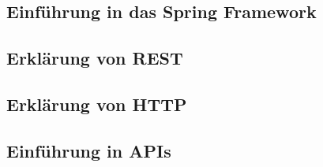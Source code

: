 \subsection{Einführung in das Spring Framework}
  \label{Einführung in das Spring Framework}
  
\pagebreak

\subsection{Erklärung von REST}
  \label{Erklärung von REST}
  
\pagebreak

\subsection{Erklärung von HTTP}
  \label{Erklärung von HTTP}
  
\pagebreak

\subsection{Einführung in APIs}
  \label{Einführung in APIs}
  
\pagebreak